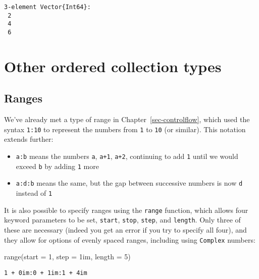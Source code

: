 \documentclass[
  letterpaper,
  DIV=11,
  numbers=noendperiod]{scrreprt}
\newenvironment{Shaded}{\begin{snugshade}}{\end{snugshade}}
\newcommand{\FloatTok}[1]{\textcolor[rgb]{0.68,0.00,0.00}{#1}}
\newcommand{\FunctionTok}[1]{\textcolor[rgb]{0.28,0.35,0.67}{#1}}
\newcommand{\NormalTok}[1]{\textcolor[rgb]{0.00,0.23,0.31}{#1}}
\newcommand{\OperatorTok}[1]{\textcolor[rgb]{0.37,0.37,0.37}{#1}}
\providecommand{\tightlist}{%
  \setlength{\itemsep}{0pt}\setlength{\parskip}{0pt}}\usepackage{longtable,booktabs,array}
\begin{document}
\begin{verbatim}
3-element Vector{Int64}:
 2
 4
 6
\end{verbatim}

\hypertarget{other-ordered-collection-types}{%
\section{Other ordered collection
types}\label{other-ordered-collection-types}}

\hypertarget{ranges}{%
\subsection{Ranges}\label{ranges}}

We've already met a type of range in Chapter~\ref{sec-controlflow},
which used the syntax \texttt{1:10} to represent the numbers from
\texttt{1} to \texttt{10} (or similar). This notation extends further:

\begin{itemize}
\tightlist
\item
  \texttt{a:b} means the numbers \texttt{a}, \texttt{a+1}, \texttt{a+2},
  continuing to add \texttt{1} until we would exceed \texttt{b} by
  adding \texttt{1} more
\item
  \texttt{a:d:b} means the same, but the gap between successive numbers
  is now \texttt{d} instead of \texttt{1}
\end{itemize}

It is also possible to specify ranges using the \texttt{range} function,
which allows four keyword parameters to be set, \texttt{start},
\texttt{stop}, \texttt{step}, and \texttt{length}. Only three of these
are necessary (indeed you get an error if you try to specify all four),
and they allow for options of evenly spaced ranges, including using
\texttt{Complex} numbers:

\begin{Shaded}
\begin{Highlighting}[]
\FunctionTok{range}\NormalTok{(start }\OperatorTok{=} \FloatTok{1}\NormalTok{, step }\OperatorTok{=} \FloatTok{1im}\NormalTok{, length }\OperatorTok{=} \FloatTok{5}\NormalTok{)}
\end{Highlighting}
\end{Shaded}

\begin{verbatim}
1 + 0im:0 + 1im:1 + 4im
\end{verbatim}
\end{document}
